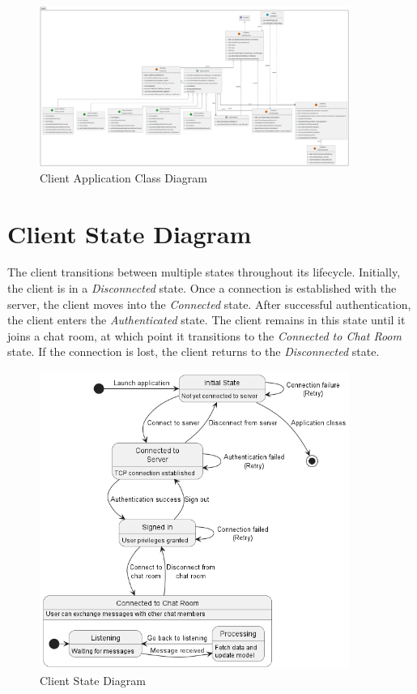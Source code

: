\documentclass[12pt,a4paper]{report}
\begin{document}
\begin{figure}[H]
  \centering
  \includegraphics[width=0.9\textwidth]{client.png}
  \caption{Client Application Class Diagram}
  \label{fig:client_class_diagram}
\end{figure}

\section{Client State Diagram}
The client transitions between multiple states throughout its lifecycle.
Initially, the client is in a \textit{Disconnected} state. Once a connection is
established with the server, the client moves into the \textit{Connected}
state. After successful authentication, the client enters the
\textit{Authenticated} state. The client remains in this state until it joins a
chat room, at which point it transitions to the \textit{Connected to Chat Room}
state. If the connection is lost, the client returns to the
\textit{Disconnected} state.

\begin{figure}[H]
  \centering
  \includegraphics[width=0.9\textwidth]{state.png}
  \caption{Client State Diagram}
  \label{fig:client_state_diagram}
\end{figure}
\end{document}
